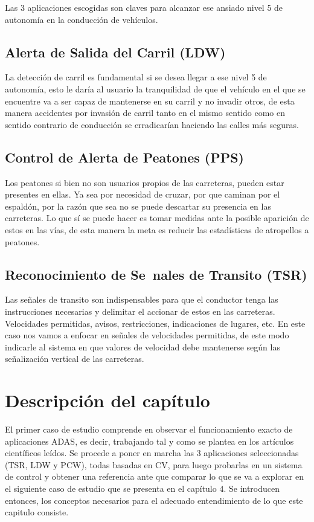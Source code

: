 Las 3 aplicaciones escogidas son claves para alcanzar ese ansiado nivel 5 de autonomía en la conducción de vehículos.


\subsection{Alerta de Salida del Carril (LDW)}

La detección de carril es fundamental si se desea llegar a ese nivel 5 de autonomía, esto le daría al usuario la tranquilidad de que el vehículo en el que se encuentre va a ser capaz de mantenerse en su carril y no invadir otros, de esta manera accidentes por invasión de carril tanto en el mismo sentido como en sentido contrario de conducción se erradicarían haciendo las calles más seguras.
\newpage
\subsection{Control de Alerta de Peatones (PPS)}

Los peatones si bien no son usuarios propios de las carreteras, pueden estar presentes en ellas. Ya sea por necesidad de cruzar, por que caminan por el espaldón, por la razón que sea no se puede descartar su presencia en las carreteras. Lo que sí se puede hacer es tomar medidas ante la posible aparición de estos en las vías, de esta manera la meta es reducir las estadísticas de atropellos a peatones. 

\subsection{Reconocimiento de Se~nales de Transito (TSR)}

Las señales de transito son indispensables para que el conductor tenga las instrucciones necesarias y delimitar el accionar de estos en las carreteras. Velocidades permitidas, avisos, restricciones, indicaciones de lugares, etc. En este caso nos vamos a enfocar en señales de velocidades permitidas, de este modo indicarle al sistema en que valores de velocidad debe mantenerse según las señalización vertical de las carreteras.

\section{Descripción del capítulo}

El primer caso de estudio comprende en observar el funcionamiento exacto de aplicaciones ADAS, es decir, trabajando tal y como se plantea en los artículos científicos leídos. Se procede a poner en marcha las 3 aplicaciones seleccionadas (TSR, LDW y PCW), todas basadas en CV, para luego probarlas en un sistema de control y obtener una referencia ante que comparar lo que se va a explorar en el siguiente caso de estudio que se presenta en el capítulo 4. Se introducen entonces, los conceptos necesarios para el adecuado entendimiento de lo que este capitulo consiste. 


